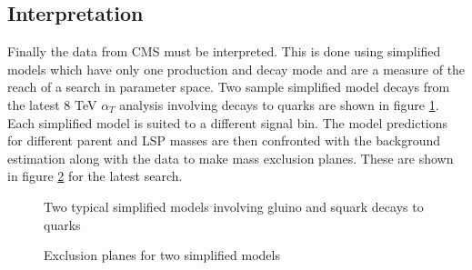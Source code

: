 \subsection{Interpretation}
Finally the data from CMS must be interpreted. This is done using simplified models which have only one production and decay mode and are a measure of the reach of a search in parameter space. Two sample simplified model decays from the latest 8 TeV $\alpha_T$ analysis involving decays to quarks are shown in figure \ref{simp}. Each simplified model is suited to a different signal bin. The model predictions for different parent and LSP masses are then confronted with the background estimation along with the data to make mass exclusion planes. These are shown in figure \ref{simp2} for the latest search.
\begin{figure}
\hfill
{}
\hfill
{}
\hfill
\caption{Two typical simplified models involving gluino and squark decays to quarks}
\label{simp}
\end{figure}
\begin{figure}
\hfill
{}
\hfill
{}
\hfill
\caption{Exclusion planes for two simplified models}
\label{simp2}
\end{figure}
